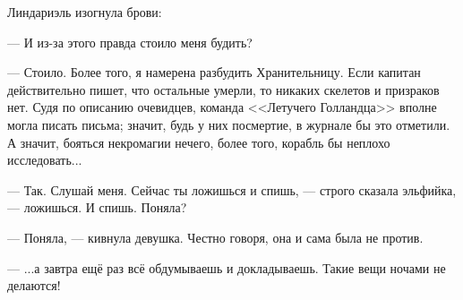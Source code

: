Линдариэль изогнула брови:

--- И из-за этого правда стоило меня будить?

--- Стоило. Более того, я намерена разбудить Хранительницу. Если капитан действительно пишет, что остальные умерли,
то никаких скелетов и призраков нет. Судя по описанию очевидцев, команда <<Летучего Голландца>> вполне могла писать письма;
значит, будь у них посмертие, в журнале бы это отметили.
А значит, бояться некромагии нечего, более того, корабль бы неплохо исследовать...

--- Так. Слушай меня. Сейчас ты ложишься и спишь, --- строго сказала эльфийка, --- ложишься. И спишь. Поняла?

--- Поняла, --- кивнула девушка. Честно говоря, она и сама была не против.

--- ...а завтра ещё раз всё обдумываешь и докладываешь. Такие вещи ночами не делаются!



\emptypar


\emptypar

